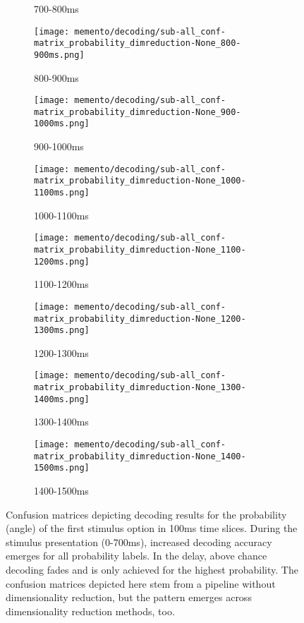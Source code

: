 \begin{figure}[H]
\begin{subfigure}{.18\textwidth}
		\caption{700-800ms}
		\label{fig:conf7}
	\end{subfigure}
	\begin{subfigure}{0.18\textwidth}
		\texttt{[image: memento/decoding/sub-all\_conf-matrix\_probability\_dimreduction-None\_800-900ms.png]}
		\caption{800-900ms}
		\label{fig:conf8}
	\end{subfigure}
	\begin{subfigure}{0.18\textwidth}
		\texttt{[image: memento/decoding/sub-all\_conf-matrix\_probability\_dimreduction-None\_900-1000ms.png]}
		\caption{900-1000ms}
		\label{fig:conf9}
	\end{subfigure}
	\begin{subfigure}{.18\textwidth}
		\texttt{[image: memento/decoding/sub-all\_conf-matrix\_probability\_dimreduction-None\_1000-1100ms.png]}
		\caption{1000-1100ms}
		\label{fig:conf5}
	\end{subfigure}
	\begin{subfigure}{0.18\textwidth}
		\texttt{[image: memento/decoding/sub-all\_conf-matrix\_probability\_dimreduction-None\_1100-1200ms.png]}
		\caption{1100-1200ms}
		\label{fig:conf6}
	\end{subfigure}
	\begin{subfigure}{.18\textwidth}
		\texttt{[image: memento/decoding/sub-all\_conf-matrix\_probability\_dimreduction-None\_1200-1300ms.png]}
		\caption{1200-1300ms}
		\label{fig:conf7}
	\end{subfigure}
	\begin{subfigure}{0.18\textwidth}
		\texttt{[image: memento/decoding/sub-all\_conf-matrix\_probability\_dimreduction-None\_1300-1400ms.png]}
		\caption{1300-1400ms}
		\label{fig:conf8}
	\end{subfigure}
	\begin{subfigure}{0.18\textwidth}
		\texttt{[image: memento/decoding/sub-all\_conf-matrix\_probability\_dimreduction-None\_1400-1500ms.png]}
		\caption{1400-1500ms}
		\label{fig:conf9}
	\end{subfigure}
		\caption[Confusion matrices of decoding results for probability]{Confusion matrices depicting decoding results for the probability (angle) of the first stimulus option in 100ms time slices. During the stimulus presentation (0-700ms), increased decoding accuracy emerges for all probability labels. In the delay, above chance decoding fades and is only achieved for the highest probability. The confusion matrices depicted here stem from a pipeline without dimensionality reduction, but the pattern emerges across dimensionality reduction methods, too.}
		\label{fig:decoding-probability-conf}
	\end{figure}

